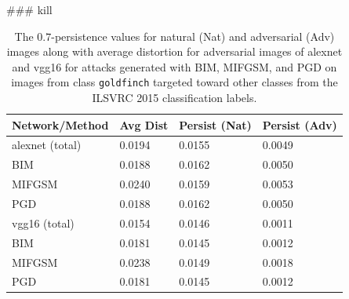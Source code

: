 ### kill

\begin{table}[ht]
\centering
\caption{The $0.7$-persistence values for natural (Nat) and adversarial (Adv) images along with average distortion for adversarial images of alexnet and vgg16 for attacks generated with BIM, MIFGSM, and PGD on images from class \texttt{goldfinch} targeted toward other classes from the ILSVRC 2015 classification labels.}
\label{TAB:PersistenceAlexVGG}
\begin{tabular}{llll}
\toprule
Network/Method & Avg Dist & Persist (Nat) & Persist (Adv) \\
\midrule
alexnet (total) & 0.0194 & 0.0155 & 0.0049 \\ 
\:\: BIM        & 0.0188 & 0.0162 & 0.0050 \\ 
\:\: MIFGSM     & 0.0240 & 0.0159 & 0.0053 \\ 
\:\: PGD        & 0.0188 & 0.0162 & 0.0050 \\ 
\midrule
vgg16   (total) & 0.0154 & 0.0146 & 0.0011 \\ 
\:\: BIM        & 0.0181 & 0.0145 & 0.0012 \\ 
\:\: MIFGSM     & 0.0238 & 0.0149 & 0.0018 \\ 
\:\: PGD        & 0.0181 & 0.0145 & 0.0012 \\ 
\bottomrule
\end{tabular}
\end{table}






